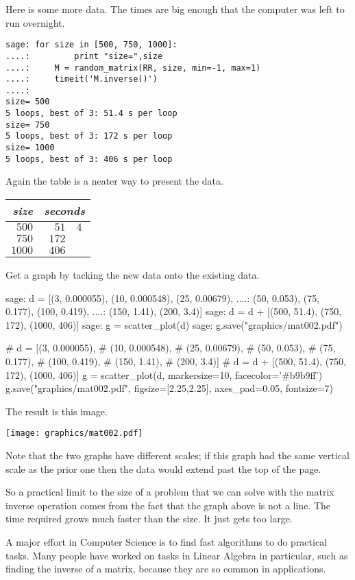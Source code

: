 Here is some more data.
The times are big enough that the computer was left to run overnight.
\begin{lstlisting}
sage: for size in [500, 750, 1000]:                             
....:         print "size=",size
....:     M = random_matrix(RR, size, min=-1, max=1)
....:     timeit('M.inverse()')
....: 
size= 500
5 loops, best of 3: 51.4 s per loop
size= 750
5 loops, best of 3: 172 s per loop
size= 1000
5 loops, best of 3: 406 s per loop
\end{lstlisting}
Again the table is a neater way to present the data.
\begin{center}
  \begin{tabular}{r|r@{.}l}
    \textit{size}     &\multicolumn{2}{c}{\textit{seconds}}  \\  \hline
    $500$       &$51$ &$4$ \\
    $750$       &$172$ &   \\
    $1000$      &$406$ &   
  \end{tabular}
\end{center}
Get a graph by tacking the new data onto the existing data.
\begin{sagecommandline}
sage: d = [(3, 0.000055), (10, 0.000548), (25, 0.00679),  
....:      (50, 0.053), (75, 0.177), (100, 0.419), 
....:      (150, 1.41), (200, 3.4)]
sage: d = d + [(500, 51.4), (750, 172), (1000, 406)]
sage: g = scatter_plot(d)                           
sage: g.save("graphics/mat002.pdf")                      
\end{sagecommandline}
\begin{sagesilent}
# d = [(3, 0.000055),    
#      (10, 0.000548), 
#      (25, 0.00679),  
#      (50, 0.053), 
#      (75, 0.177), 
#      (100, 0.419), 
#      (150, 1.41), 
#      (200, 3.4)]
# d = d + [(500, 51.4), (750, 172), (1000, 406)]
g = scatter_plot(d, markersize=10, facecolor='#b9b9ff')
g.save("graphics/mat002.pdf", figsize=[2.25,2.25], axes_pad=0.05, fontsize=7)              
\end{sagesilent}
The result is this image.
\begin{center}
  \texttt{[image: graphics/mat002.pdf]}
\end{center}
Note that the two graphs have different scales;
if this graph had the same vertical scale as the prior one
then the data would extend past the top of the page.

So a practical limit to the size of a problem that we can solve with
the matrix inverse operation comes from the fact that the graph above is
not a line.
The time required grows much faster than the size.
It just gets too large. 

A major effort in Computer Science is to find fast algorithms to 
do practical tasks.
Many people have worked on tasks in Linear Algebra in particular,
such as finding the inverse of a matrix, because
they are so common in applications.

\endinput


TODO:
